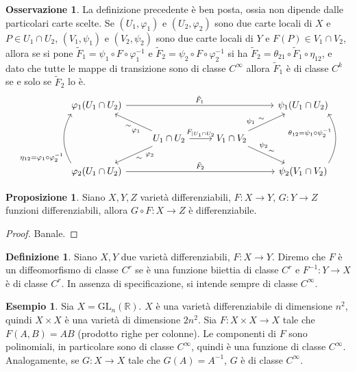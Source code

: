 \documentclass[a4paper,11pt]{article}
\theoremstyle{definition}
\newtheorem{osservazione}{Osservazione}[section]
\newtheorem{definizione}{Definizione}[section]
\newtheorem{esempio}{Esempio}[section]
\theoremstyle{theorem}
\newtheorem{proposizione}{Proposizione}[section]
\begin{document}
\begin{osservazione}
	La definizione precedente è ben posta, ossia non dipende dalle particolari carte scelte. Se $(U_1,\varphi_1)$ e $(U_2,\varphi_2)$ sono due carte locali di $X$ e $P\in U_1\cap U_2$, $(V_1,\psi_1)$ e $(V_2,\psi_2)$ sono due carte locali di $Y$ e $F(P)\in V_1\cap V_2$, allora se si pone $\tilde{F}_1=\psi_1\circ F\circ \varphi_1^{-1}$ e $\tilde{F}_2=\psi_2\circ F\circ \varphi_2^{-1}$ si ha $\tilde {F}_2=\theta_{21}\circ\tilde{F}_1\circ\eta_{12}$, e dato che tutte le mappe di transizione sono di classe $C^\infty$ allora $\tilde{F}_1$ è di classe $C^k$ se e solo se $\tilde{F}_2$ lo è.
	\[\begin{tikzcd}
		\varphi_1(U_1\cap U_2)\arrow[rrr, "\tilde{F}_1"] & & &\psi_1(U_1\cap U_2) \\
		&U_1\cap U_2 \arrow[ul, "\sim", "\varphi_1" near start]\arrow[r, "F_{|U_1\cap U_2}"]\arrow[dl, "\sim", "\varphi_2" near start]& V_1\cap V_2\arrow[ur,"\sim", "\psi_1" near start]\arrow[dr,"\sim", "\psi_2" near start] &\\
		\varphi_2(U_1\cap U_2)\arrow[rrr,"\tilde{F}_2"]\arrow[uu, bend left,  shift left=5ex, near start, "\eta_{12}=\varphi_1\circ\varphi_2^{-1}"]& & &\psi_2(V_1\cap V_2) \arrow[uu,bend right, shift right=5ex, near end, "\theta_{12}=\psi_1\circ\psi_2^{-1}"]
	\end{tikzcd}\]
\end{osservazione}
\begin{proposizione}
	Siano $X,Y,Z$ varietà differenziabili, $F\colon X\to Y$, $G\colon Y\to Z$ funzioni differenziabili, allora $G\circ F\colon X\to Z$ è differenziabile.
\end{proposizione}
\begin{proof}
	Banale.
\end{proof}
\begin{definizione}
	Siano $X,Y$ due varietà differenziabili, $F\colon X\to Y$. Diremo che $F$ è un diffeomorfismo di classe $C^r$ se è una funzione biiettia di classe $C^r$ e $F^{-1}\colon Y\to X$ è di classe $C^r$. In assenza di specificazione, si intende sempre di classe $C^\infty$.
\end{definizione}
\begin{esempio}
	Sia $X=\mathrm{GL}_n(\mathbb{R})$. $X$ è una varietà differenziabile di dimensione $n^2$, quindi $X\times X$ è una varietà di dimensione $2n^2$. Sia $F\colon X\times X\to X$ tale che $F(A,B)=AB$ (prodotto righe per colonne). Le componenti di $F$ sono polinomiali, in particolare sono di classe $C^\infty$, quindi è una funzione di classe $C^\infty$. Analogamente, se $G\colon X\to X$ tale che $G(A)=A^{-1}$, $G$ è di classe $C^\infty$.
\end{esempio}
\end{document}

